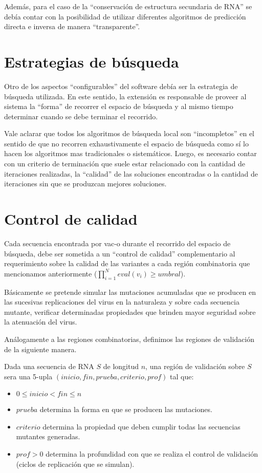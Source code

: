 Adem\'as, para el caso de la ``conservaci\'on de estructura secundaria de
\ac{RNA}'' se deb\'ia contar con la posibilidad de utilizar diferentes
algoritmos de predicci\'on directa e inversa de manera ``transparente''.

\section{Estrategias de b\'usqueda}

Otro de los aspectos ``configurables'' del software deb\'ia ser la estrategia
de b\'usqueda utilizada. En este sentido, la extensi\'on es responsable de
proveer al sistema la ``forma'' de recorrer el espacio de b\'usqueda y al mismo
tiempo determinar cuando se debe terminar el recorrido.

Vale aclarar que todos los algoritmos de b\'usqueda local son ``incompletos''
en el sentido de que no recorren exhaustivamente el espacio de b\'usqueda como
s\'i lo hacen los algoritmos mas tradicionales o sistem\'aticos. Luego, es
necesario contar con un criterio de terminaci\'on que suele estar relacionado
con la cantidad de iteraciones realizadas, la ``calidad'' de las soluciones
encontradas o la cantidad de iteraciones sin que se produzcan mejores
soluciones.

\section{Control de calidad}

Cada secuencia encontrada por \ac{vac-o} durante el recorrido del espacio
de b\'usqueda, debe ser sometida a un ``control de calidad'' complementario al
requerimiento sobre la calidad de las variantes a cada regi\'on combinatoria
que mencionamos anteriormente ($\prod_{i=1}^{N} eval(v_{i}) \ge umbral$).

B\'asicamente se pretende simular las mutaciones acumuladas que se producen en
las sucesivas replicaciones del virus en la naturaleza y sobre cada secuencia
mutante, verificar determinadas propiedades que brinden mayor seguridad sobre la
atenuaci\'on del virus.

An\'alogamente a las regiones combinatorias, definimos las regiones de
validaci\'on de la siguiente manera.

\begin{definition}
Dada una secuencia de \ac{RNA} $S$ de longitud $n$, una regi\'on de validaci\'on
sobre $S$ sera una 5-upla $(inicio, fin, prueba, criterio, prof)$ tal que:
\begin{itemize}
 \item $0 \le inicio < fin \le n$
 \item $prueba$ determina la forma en que se producen las mutaciones.
 \item $criterio$ determina la propiedad que deben cumplir todas las secuencias
mutantes generadas.
 \item $prof>0$ determina la profundidad con que se realiza el control de
validaci\'on (ciclos de replicaci\'on que se simulan).
\end{itemize}
\end{definition}

